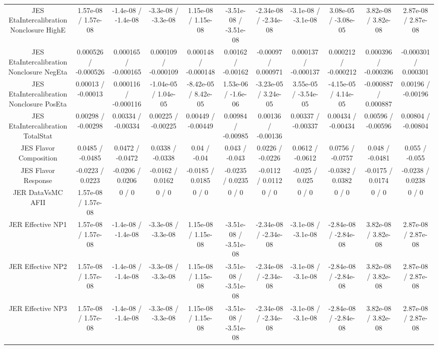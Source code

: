 \begin{table}[htbp]
\begin{center}
\begin{tabular}{|c|c|c|c|c|c|c|c|c|c|c|}
  JES EtaIntercalibration Nonclosure HighE & 1.57e-08 / 1.57e-08 & -1.4e-08 / -1.4e-08 & -3.3e-08 / -3.3e-08 & 1.15e-08 / 1.15e-08 & -3.51e-08 / -3.51e-08 & -2.34e-08 / -2.34e-08 & -3.1e-08 / -3.1e-08 & 3.08e-05 / -3.08e-05 & 3.82e-08 / 3.82e-08 & 2.87e-08 / 2.87e-08 \\ 
  JES EtaIntercalibration Nonclosure NegEta & 0.000526 / -0.000526 & 0.000165 / -0.000165 & 0.000109 / -0.000109 & 0.000148 / -0.000148 & 0.00162 / -0.00162 & -0.00097 / 0.000971 & 0.000137 / -0.000137 & 0.000212 / -0.000212 & 0.000396 / -0.000396 & -0.000301 / 0.000301 \\ 
  JES EtaIntercalibration Nonclosure PosEta & 0.00013 / -0.00013 & 0.000116 / -0.000116 & -1.04e-05 / 1.04e-05 & -8.42e-05 / 8.42e-05 & 1.53e-06 / -1.6e-06 & -3.23e-05 / 3.24e-05 & 3.55e-05 / -3.54e-05 & -4.15e-05 / 4.14e-05 & -0.000887 / 0.000887 & 0.00196 / -0.00196 \\ 
  JES EtaIntercalibration TotalStat & 0.00298 / -0.00298 & 0.00334 / -0.00334 & 0.00225 / -0.00225 & 0.00449 / -0.00449 & 0.00984 / -0.00985 & 0.00136 / -0.00136 & 0.00337 / -0.00337 & 0.00434 / -0.00434 & 0.00596 / -0.00596 & 0.00804 / -0.00804 \\ 
  JES Flavor Composition & 0.0485 / -0.0485 & 0.0472 / -0.0472 & 0.0338 / -0.0338 & 0.04 / -0.04 & 0.043 / -0.043 & 0.0226 / -0.0226 & 0.0612 / -0.0612 & 0.0756 / -0.0757 & 0.048 / -0.0481 & 0.055 / -0.055 \\ 
  JES Flavor Response & -0.0223 / 0.0223 & -0.0206 / 0.0206 & -0.0162 / 0.0162 & -0.0185 / 0.0185 & -0.0235 / 0.0235 & -0.0112 / 0.0112 & -0.025 / 0.025 & -0.0382 / 0.0382 & -0.0175 / 0.0174 & -0.0238 / 0.0238 \\ 
  JER DataVsMC AFII & 1.57e-08 / 1.57e-08 & 0 / 0 & 0 / 0 & 0 / 0 & 0 / 0 & 0 / 0 & 0 / 0 & 0 / 0 & 0 / 0 & 0 / 0 \\ 
  JER Effective NP1 & 1.57e-08 / 1.57e-08 & -1.4e-08 / -1.4e-08 & -3.3e-08 / -3.3e-08 & 1.15e-08 / 1.15e-08 & -3.51e-08 / -3.51e-08 & -2.34e-08 / -2.34e-08 & -3.1e-08 / -3.1e-08 & -2.84e-08 / -2.84e-08 & 3.82e-08 / 3.82e-08 & 2.87e-08 / 2.87e-08 \\ 
  JER Effective NP2 & 1.57e-08 / 1.57e-08 & -1.4e-08 / -1.4e-08 & -3.3e-08 / -3.3e-08 & 1.15e-08 / 1.15e-08 & -3.51e-08 / -3.51e-08 & -2.34e-08 / -2.34e-08 & -3.1e-08 / -3.1e-08 & -2.84e-08 / -2.84e-08 & 3.82e-08 / 3.82e-08 & 2.87e-08 / 2.87e-08 \\ 
  JER Effective NP3 & 1.57e-08 / 1.57e-08 & -1.4e-08 / -1.4e-08 & -3.3e-08 / -3.3e-08 & 1.15e-08 / 1.15e-08 & -3.51e-08 / -3.51e-08 & -2.34e-08 / -2.34e-08 & -3.1e-08 / -3.1e-08 & -2.84e-08 / -2.84e-08 & 3.82e-08 / 3.82e-08 & 2.87e-08 / 2.87e-08 \\ 

\end{tabular}
\end{center}
\end{table}
